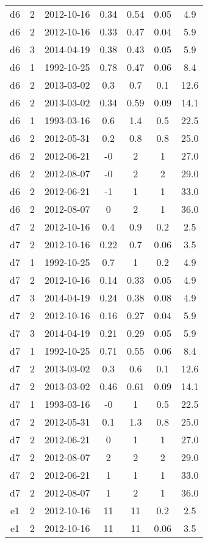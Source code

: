 \begin{longtable}{ccccccc}
d6 & 2 & 2012-10-16 & 0.34 & 0.54 & 0.05 & 4.9 \\
d6 & 2 & 2012-10-16 & 0.33 & 0.47 & 0.04 & 5.9 \\
d6 & 3 & 2014-04-19 & 0.38 & 0.43 & 0.05 & 5.9 \\
d6 & 1 & 1992-10-25 & 0.78 & 0.47 & 0.06 & 8.4 \\
d6 & 2 & 2013-03-02 & 0.3 & 0.7 & 0.1 & 12.6 \\
d6 & 2 & 2013-03-02 & 0.34 & 0.59 & 0.09 & 14.1 \\
d6 & 1 & 1993-03-16 & 0.6 & 1.4 & 0.5 & 22.5 \\
d6 & 2 & 2012-05-31 & 0.2 & 0.8 & 0.8 & 25.0 \\
d6 & 2 & 2012-06-21 & -0 & 2 & 1 & 27.0 \\
d6 & 2 & 2012-08-07 & -0 & 2 & 2 & 29.0 \\
d6 & 2 & 2012-06-21 & -1 & 1 & 1 & 33.0 \\
d6 & 2 & 2012-08-07 & 0 & 2 & 1 & 36.0 \\
d7 & 2 & 2012-10-16 & 0.4 & 0.9 & 0.2 & 2.5 \\
d7 & 2 & 2012-10-16 & 0.22 & 0.7 & 0.06 & 3.5 \\
d7 & 1 & 1992-10-25 & 0.7 & 1 & 0.2 & 4.9 \\
d7 & 2 & 2012-10-16 & 0.14 & 0.33 & 0.05 & 4.9 \\
d7 & 3 & 2014-04-19 & 0.24 & 0.38 & 0.08 & 4.9 \\
d7 & 2 & 2012-10-16 & 0.16 & 0.27 & 0.04 & 5.9 \\
d7 & 3 & 2014-04-19 & 0.21 & 0.29 & 0.05 & 5.9 \\
d7 & 1 & 1992-10-25 & 0.71 & 0.55 & 0.06 & 8.4 \\
d7 & 2 & 2013-03-02 & 0.3 & 0.6 & 0.1 & 12.6 \\
d7 & 2 & 2013-03-02 & 0.46 & 0.61 & 0.09 & 14.1 \\
d7 & 1 & 1993-03-16 & -0 & 1 & 0.5 & 22.5 \\
d7 & 2 & 2012-05-31 & 0.1 & 1.3 & 0.8 & 25.0 \\
d7 & 2 & 2012-06-21 & 0 & 1 & 1 & 27.0 \\
d7 & 2 & 2012-08-07 & 2 & 2 & 2 & 29.0 \\
d7 & 2 & 2012-06-21 & 1 & 1 & 1 & 33.0 \\
d7 & 2 & 2012-08-07 & 1 & 2 & 1 & 36.0 \\
e1 & 2 & 2012-10-16 & 11 & 11 & 0.2 & 2.5 \\
e1 & 2 & 2012-10-16 & 11 & 11 & 0.06 & 3.5 \\

\end{longtable}
